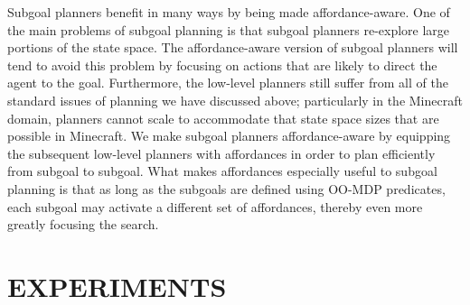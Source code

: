\documentclass[]{article}
\newcommand{\stnote}[1]{\textcolor{Blue}{\textbf{ST: #1}}}
\newcommand{\jmnote}[1]{\textcolor{Green}{\textbf{JM: #1}}}
\begin{document}
Subgoal planners benefit in many ways by being made affordance-aware.
One of the main problems of subgoal planning is that subgoal planners
re-explore large portions of the state space. The affordance-aware version of subgoal planners
will tend to avoid this problem by focusing on actions that are likely
to direct the agent to the goal. Furthermore, the low-level planners still suffer from all of the
standard issues of planning we have discussed above; particularly in
the Minecraft domain, planners cannot scale to accommodate that state
space sizes that are possible in Minecraft. We make subgoal planners affordance-aware by
equipping the subsequent low-level planners with affordances in order
to plan efficiently from subgoal to subgoal. What makes affordances
especially useful to subgoal planning is that as long as the subgoals
are defined using OO-MDP predicates, each subgoal may activate a
different set of affordances, thereby even more greatly focusing the
search.






\section{EXPERIMENTS}

%

\end{document}

